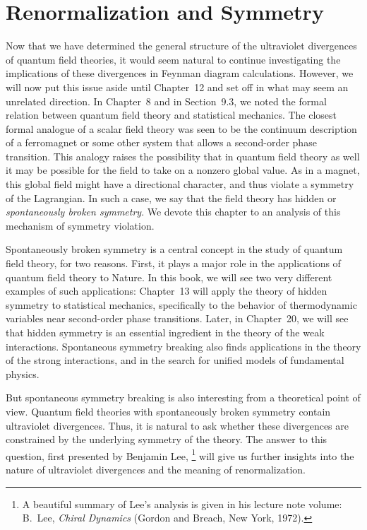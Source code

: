 \chapter{Renormalization and Symmetry}

Now that we have determined the general structure of the ultraviolet
divergences of quantum field theories, it would seem natural to continue
investigating the implications of these divergences in Feynman diagram
calculations.  However, we will now put this issue aside until Chapter~12 and
set off in what may seem an unrelated direction.  In Chapter~8 and in
Section~9.3, we noted the formal relation between quantum field theory and
statistical mechanics.  The closest formal analogue of a scalar field theory
was seen to be the continuum description of a ferromagnet or some other system
that allows a second-order phase transition.  This analogy raises the
possibility that in quantum field theory as well it may be possible for the
field to take on a nonzero global value.  As in a magnet, this global field
might have a directional character, and thus violate a symmetry of the
Lagrangian.  In such a case, we say that the field theory has hidden or
\emph{spontaneously broken symmetry}.  We devote this chapter to an analysis
of this mechanism of symmetry violation.

Spontaneously broken symmetry is a central concept in the study of quantum
field theory, for two reasons.  First, it plays a major role in the
applications of quantum field theory to Nature.  In this book, we will see two
very different examples of such applications: Chapter~13 will apply the theory
of hidden symmetry to statistical mechanics, specifically to the behavior of
thermodynamic variables near second-order phase transitions.  Later, in
Chapter~20, we will see that hidden symmetry is an essential ingredient in the
theory of the weak interactions.  Spontaneous symmetry breaking also finds
applications in the theory of the strong interactions, and in the search for
unified models of fundamental physics.

But spontaneous symmetry breaking is also interesting from a theoretical point
of view.  Quantum field theories with spontaneously broken symmetry contain
ultraviolet divergences.  Thus, it is natural to ask whether these divergences
are constrained by the underlying symmetry of the theory.  The answer to this
question, first presented by Benjamin Lee,%
\footnote{A beautiful summary of Lee's analysis is given in his lecture note
volume: B.~Lee, \emph{Chiral Dynamics} (Gordon and Breach, New York, 1972).}
will give us further insights into the nature of ultraviolet divergences and
the meaning of renormalization.

